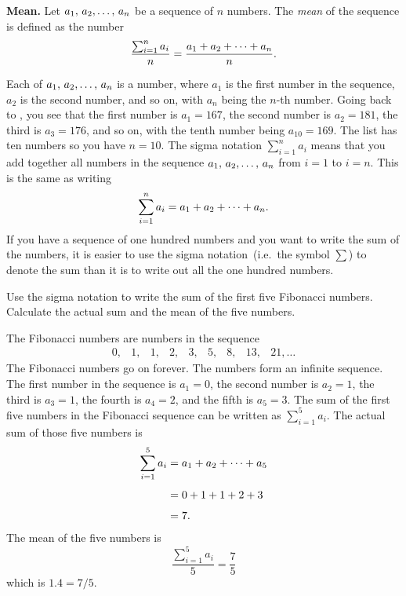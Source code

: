 \documentclass[a4paper,oneside,12pt]{article}
\begin{document}
\begin{definition}
\textbf{Mean.}
Let ${a_1},\, {a_2}, \dots,\, {a_n}$ be a sequence of $n$ numbers.  The
\emph{mean} of the sequence is defined as the number
\[
\frac{
  \sum_{i=1}^n a_i
}{
  n
}
=
\frac{
  {a_1} + {a_2} + \cdots + {a_n}
}{
  n
}.
\]
\end{definition}

Each of ${a_1},\, {a_2}, \dots,\, {a_n}$ is a number, where $a_1$ is the first
number in the sequence, $a_2$ is the second number, and so on, with
$a_n$ being the $n$-th number.  Going back to
, you see that the first number
is $a_1 = 167$, the second number is $a_2 = 181$, the third is
$a_3 = 176$, and so on, with the tenth number being $a_{10} = 169$.
The list has ten numbers so you have $n = 10$.  The sigma notation
$\sum_{i=1}^n a_i$ means that you add together all numbers in the
sequence ${a_1},\, {a_2}, \dots,\, {a_n}$ from $i = 1$ to $i = n$.  This is the
same as writing
\[
\sum_{i=1}^n a_i
=
{a_1} + {a_2} + \cdots + {a_n}.
\]
If you have a sequence of one hundred numbers and you want to write
the sum of the numbers, it is easier to use the sigma
notation~(i.e.~the symbol $\sum$) to denote the sum than it is to
write out all the one hundred numbers.

\begin{example}
Use the sigma notation to write the sum of the first five Fibonacci
numbers.  Calculate the actual sum and the mean of the five numbers.
\end{example}

\begin{solution}
The Fibonacci numbers are numbers in the sequence
\[
\begin{matrix}
0, & 1, & 1, & 2, & 3, & 5, & 8, & 13, & 21, \dots
\end{matrix}
\]
The Fibonacci numbers go on forever.  The numbers form an infinite
sequence.  The first number in the sequence is $a_1 = 0$, the second
number is $a_2 = 1$, the third is $a_3 = 1$, the fourth is $a_4 = 2$,
and the fifth is $a_5 = 3$.  The sum of the first five numbers in the
Fibonacci sequence can be written as $\sum_{i=1}^5 a_i$.  The actual
sum of those five numbers is
\begin{align*}
\sum_{i=1}^5 a_i
&=
{a_1} + {a_2} + \cdots + {a_5} \\[4pt]
&=
0 + 1 + 1 + 2 + 3 \\[4pt]
&=
7.
\end{align*}
The mean of the five numbers is
\[
\frac{
  \sum_{i=1}^5 a_i
}{
  5
}
=
\frac{7}{5}
\]
which is $1.4 = 7 / 5$.
\end{solution}
\end{document}
